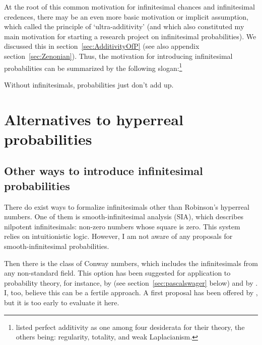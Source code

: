 At the root of this common motivation for infinitesimal chances and infinitesimal credences, there may be an even more basic motivation or implicit assumption, which \citet{Skyrms:1983a} called the principle of `ultra-additivity' (and which also constituted my main motivation for starting a research project on infinitesimal probabilities). We discussed this in section~\ref{sec:AdditivityOfP} (see also appendix section~\ref{sec:Zenonian}).
Thus, the motivation for introducing infinitesimal probabilities can be summarized by the following slogan:\footnote{\citet{Benci_etal:2018} listed perfect additivity as one among four desiderata for their theory, the others being: regularity, totality, and weak Laplacianism.}
\begin{center}
Without infinitesimals, probabilities just don't add up.
\end{center}

\section{Alternatives to hyperreal probabilities}\label{sec:OtherApproaches}
\subsection{Other ways to introduce infinitesimal probabilities}
There do exist ways to formalize infinitesimals other than Robinson's hyperreal numbers. One of them is smooth-infinitesimal analysis (SIA), which describes nilpotent infinitesimals: non-zero numbers whose square is zero. This system relies on intuitionistic logic. However, I am not aware of any proposals for smooth-infinitesimal probabilities.

Then there is the class of Conway numbers, which includes the infinitesimals from any non-standard field. This option has been suggested for application to probability theory, for instance, by \citet{Hajek:2003b} (see section~\ref{sec:pascalswager} below) and
by \citet{Easwaran:2014}. I, too, believe this can be a fertile approach. A first proposal has been offered by \citet{ChenRubio:forthc}, but it is too early to evaluate it here.

